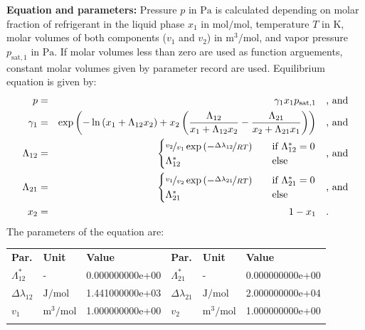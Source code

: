 \textbf{Equation and parameters:}
\newline
%
Pressure $p$ in $\si{\pascal}$ is calculated depending on molar fraction of refrigerant in the liquid phase $x_1$ in $\si{\mole\per\mole}$, temperature $T$ in $\si{\kelvin}$, molar volumes of both components ($v_1$ and $v_2$) in $\si{\cubic\meter\per\mole}$, and vapor pressure $p_\mathrm{sat,1}$ in $\si{\pascal}$. If molar volumes less than zero are used as function arguements, constant molar volumes given by parameter record are used. Equilibrium equation is given by:
%
\begin{equation*}
\begin{split}
p &=& \gamma_1 x_1 p_\mathrm{sat,1} & \quad\text{, and} \\
\gamma_1 &=& \exp \left( - \ln \left( x_1 + \Lambda_{12} x_2 \right) + x_2 \left( \frac{\Lambda_{12}}{x_1 + \Lambda_{12} x_2} - \frac{\Lambda_{21}}{x_2 + \Lambda_{21} x_1} \right) \right) & \quad\text{, and} \\
\Lambda_{12} &=& \begin{cases} \nicefrac{v_2}{v_1} \exp \left( - \nicefrac{\Delta\lambda_{12}}{R T} \right) & \quad \text{if } \Lambda_{12}^{*} = 0 \\ \Lambda_{12}^{*}  & \quad \text{else} \end{cases}  & \quad\text{, and} \\
\Lambda_{21} &=& \begin{cases} \nicefrac{v_1}{v_2} \exp \left( - \nicefrac{\Delta\lambda_{21}}{R T} \right) & \quad \text{if } \Lambda_{21}^{*} = 0 \\ \Lambda_{21}^{*}  & \quad \text{else} \end{cases}  & \quad\text{, and} \\
x_2 &=& 1 - x_1  & \quad\text{.} \\
\end{split}
\end{equation*}
%
The parameters of the equation are:
%
\begin{longtable}[l]{lll|lll}
\toprule
\addlinespace
\textbf{Par.} & \textbf{Unit} & \textbf{Value} &	\textbf{Par.} & \textbf{Unit} & \textbf{Value} \\
\addlinespace
\midrule
\endhead

\bottomrule
\endfoot
\bottomrule
\endlastfoot
\addlinespace

$\Lambda_{12}^{*}$ & - & 0.000000000e+00 & $\Lambda_{21}^{*}$ & - & 0.000000000e+00 \\
$\Delta\lambda_{12}$ & $\si{\joule\per\mole}$ & 1.441000000e+03 & $\Delta\lambda_{21}$ & $\si{\joule\per\mole}$ & 2.000000000e+04 \\
$v_1$ & $\si{\cubic\meter\per\mole}$ & 1.000000000e+00 & $v_2$ & $\si{\cubic\meter\per\mole}$ & 1.000000000e+00 \\

\addlinespace\end{longtable}


